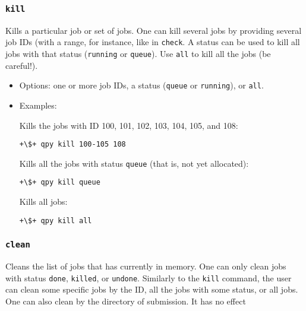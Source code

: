 \documentclass[a4paper,12pt]{article}
\begin{document}
\subsubsection{\texttt{kill}}

Kills a particular job or set of jobs.
One can kill several jobs by providing several job IDs (with a range, for instance, like in \texttt{check}.
A status can be used to kill all jobs with that status (\texttt{running} or \texttt{queue}).
Use \texttt{all} to kill all the jobs (be careful!).

\begin{itemize}
\item Options:
  one or more job IDs, a status (\texttt{queue} or \texttt{running}), or \texttt{all}.

\item Examples:

  Kills the jobs with ID 100, 101, 102, 103, 104, 105, and 108:

  \begin{lstlisting}[style=BashStyle]
+\$+ qpy kill 100-105 108
  \end{lstlisting}

  Kills all the jobs with status \texttt{queue} (that is, not yet allocated):

  \begin{lstlisting}[style=BashStyle]
+\$+ qpy kill queue
  \end{lstlisting}

  Kills all jobs:

  \begin{lstlisting}[style=BashStyle]
+\$+ qpy kill all
  \end{lstlisting}
\end{itemize}

\subsubsection{\texttt{clean}}

Cleans the list of jobs that \qpy{} has currently in memory.
One can only clean jobs with status \texttt{done}, \texttt{killed}, or \texttt{undone}.
Similarly to the \texttt{kill} command, the user can clean some specific jobs by the ID, all the jobs with some status, or all jobs.
One can also clean by the directory of submission.
It has no effect
\end{document}
